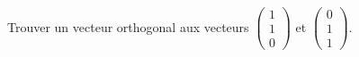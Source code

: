
\begin{exercice}\label{exoOutilsMath-0069}

    Trouver un vecteur orthogonal aux vecteurs $\begin{pmatrix}
        1    \\ 
        1    \\ 
        0    
    \end{pmatrix}$ et $\begin{pmatrix}
        0    \\ 
        1    \\ 
        1    
    \end{pmatrix}$.

\end{exercice}
